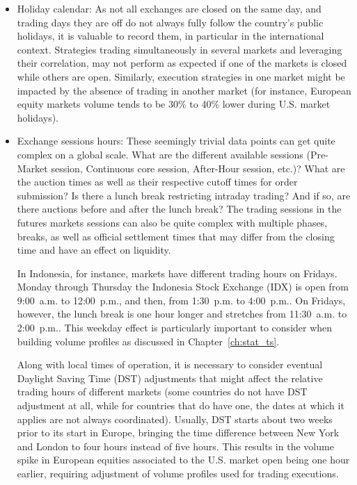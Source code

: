 \begin{itemize}
\begin{itemize}
\item Holiday calendar: As not all exchanges are closed on the same day, and trading days they are off do not always fully follow the country's public holidays, it is valuable to record them, in particular in the international context. Strategies trading simultaneously in several markets and leveraging their correlation, may not perform as expected if one of the markets is closed while others are open. Similarly, execution strategies in one market might be impacted by the absence of trading in another market (for instance, European equity markets volume tends to be 30\% to 40\% lower during U.S. market holidays).

\item Exchange sessions hours: These seemingly trivial data points can get quite complex on a global scale. What are the different available sessions (Pre-Market session, Continuous core session, After-Hour session, etc.)? What are the auction times as well as their respective cutoff times for order submission? Is there a lunch break restricting intraday trading? And if so, are there auctions before and after the lunch break?  The trading sessions in the futures markets sessions can also be quite complex with multiple phases, breaks, as well as official settlement times that may differ from the closing time and have an effect on liquidity.

In Indonesia, for instance, markets have different trading hours on Fridays. Monday through Thursday the Indonesia Stock Exchange (IDX) is open from 9:00~a.m. to 12:00~p.m., and then, from 1:30~p.m. to 4:00~p.m.. On Fridays, however, the lunch break is one hour longer and stretches from 11:30~a.m. to 2:00~p.m.. This weekday effect is particularly important to consider when building volume profiles as discussed in Chapter~\ref{ch:stat_ts}.

Along with local times of operation, it is necessary to consider eventual Daylight Saving Time (DST) adjustments that might affect the relative trading hours of different markets (some countries do not have DST adjustment at all, while for countries that do have one, the dates at which it applies are not always coordinated). Usually, DST starts about two weeks prior to its start in Europe, bringing the time difference between New York and London to four hours instead of five hours. This results in the volume spike in European equities associated to the U.S. market open being one hour earlier, requiring adjustment of volume profiles used for trading executions.


\end{itemize}
\end{itemize}
